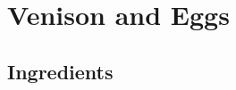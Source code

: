 \thispagestyle{fancy}
\section{Venison and Eggs}
\AddToShipoutPicture*{\SteakAndEggs}

\subsection*{Ingredients}